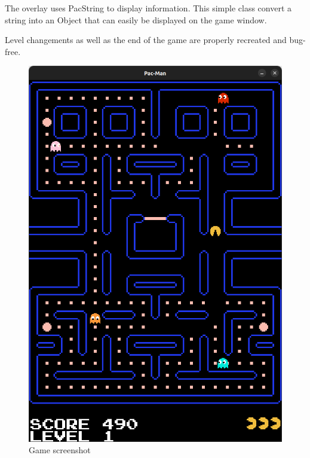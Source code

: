 The overlay uses \textsf{PacString} to display information. This simple class convert a string into an \textsf{Object} that can easily be displayed on the game window.

Level changements as well as the end of the game are properly recreated and bug-free.

\begin{figure}
    \center
    \includegraphics[scale=.22]{img/game.png}
    \caption{Game screenshot}
    \label{game}
\end{figure}